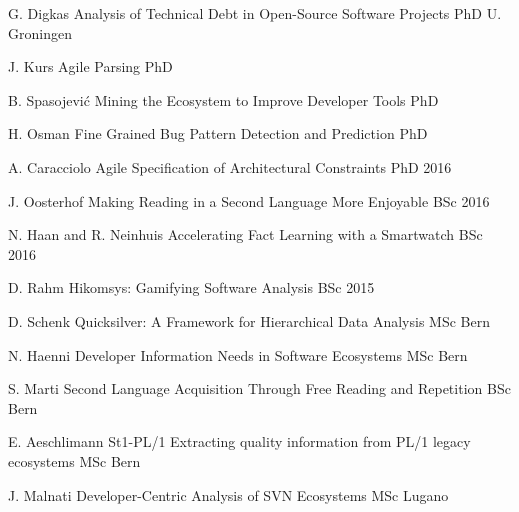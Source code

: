 \begin{enumerate}

\super 
	{G. Digkas}
	{Analysis of Technical Debt in Open-Source Software Projects}
	{PhD}
	{U. Groningen}
	{}

\super 
	{J. Kurs}
	{Agile Parsing}
	{PhD}
	{\Bern}
	{\inprogrcosup}	

\super 
	{B. Spasojevi\'{c}}
	{Mining the Ecosystem to Improve Developer Tools}
	{PhD}
	{\Bern}
	{\inprogrcosup}

\super 
	{H. Osman}
	{Fine Grained Bug Pattern Detection and Prediction}
	{PhD}
	{\Bern}
	{\inprogrcosup}	

\super 
	{A. Caracciolo}
	{Agile Specification of Architectural Constraints}
	{PhD}
	{\Bern}
	{2016 }

\super 
	{J. Oosterhof}
	{Making Reading in a Second Language More Enjoyable}
	{BSc}
	{\Groningen}
	{2016}

\super 
	{N. Haan and R. Neinhuis}
	{Accelerating Fact Learning with a Smartwatch}
	{BSc}
	{\Groningen}
	{2016}


\super 
	{D. Rahm}
	{Hikomsys: Gamifying Software Analysis}
	{BSc}
	{\Bern}
	{2015}


\super 
	{D. Schenk}
	{Quicksilver: A Framework for Hierarchical Data Analysis}
	{MSc}
	{Bern}
	{}

\super 
	{N. Haenni}
	{Developer Information Needs in Software Ecosystems}
	{MSc}
	{Bern}
	{}

\super 
	{S. Marti}
	{Second Language Acquisition Through Free Reading and Repetition}
	{BSc}
	{Bern}
	{}

\super 
	{E. Aeschlimann}
	{St1-PL/1
Extracting quality information from PL/1 legacy ecosystems}
	{MSc}
	{Bern}
	{}



\super 
	{J. Malnati}
	{Developer-Centric Analysis of SVN Ecosystems}
	{MSc}
	{Lugano}
	{}



\end{enumerate}